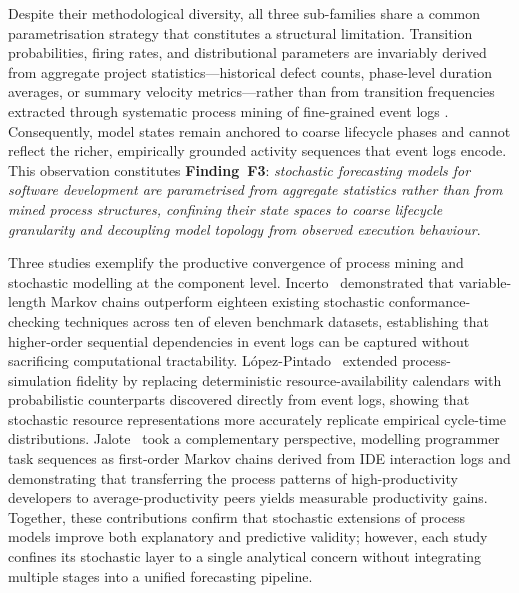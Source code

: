 Despite their methodological diversity, all three sub-families share a common
parametrisation strategy that constitutes a structural limitation. Transition
probabilities, firing rates, and distributional parameters are invariably derived
from aggregate project statistics---historical defect counts, phase-level duration
averages, or summary velocity metrics---rather than from transition frequencies
extracted through systematic process mining of fine-grained event logs
\cite{nafreen2020,bhadra2022,li2020}. Consequently, model states remain anchored
to coarse lifecycle phases and cannot reflect the richer, empirically grounded
activity sequences that event logs encode. This observation constitutes
\textbf{Finding~F3}: \emph{stochastic forecasting models for software development
are parametrised from aggregate statistics rather than from mined process
structures, confining their state spaces to coarse lifecycle granularity and
decoupling model topology from observed execution behaviour}.

Three studies exemplify the productive convergence of process mining and
stochastic modelling at the component level. Incerto~\cite{incerto2025}
demonstrated that variable-length Markov chains outperform eighteen existing
stochastic conformance-checking techniques across ten of eleven benchmark
datasets, establishing that higher-order sequential dependencies in event logs
can be captured without sacrificing computational tractability.
L\'opez-Pintado~\cite{lopezpintado2023} extended process-simulation fidelity by
replacing deterministic resource-availability calendars with probabilistic
counterparts discovered directly from event logs, showing that stochastic
resource representations more accurately replicate empirical cycle-time
distributions. Jalote~\cite{jalote2021} took a complementary perspective,
modelling programmer task sequences as first-order Markov chains derived from
IDE interaction logs and demonstrating that transferring the process patterns of
high-productivity developers to average-productivity peers yields measurable
productivity gains. Together, these contributions confirm that stochastic
extensions of process models improve both explanatory and predictive validity;
however, each study confines its stochastic layer to a single analytical
concern without integrating multiple stages into a unified forecasting pipeline.

